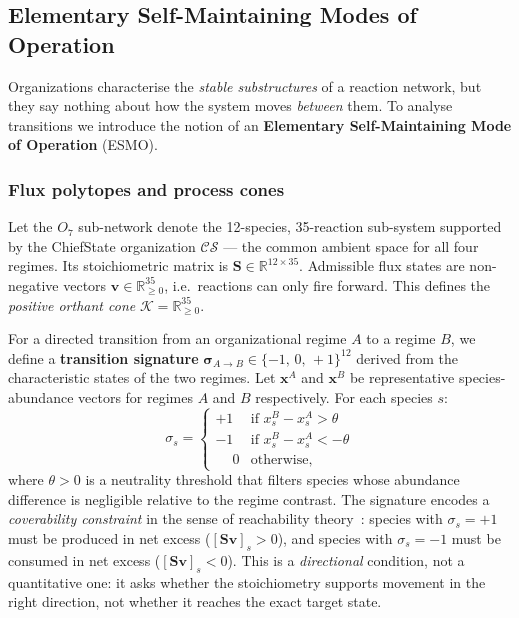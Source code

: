 \subsection{Elementary Self-Maintaining Modes of Operation}
\label{sec:esmo_theory}

Organizations characterise the \emph{stable substructures} of a reaction
network, but they say nothing about how the system moves \emph{between}
them.  To analyse transitions we introduce the notion of an
\textbf{Elementary Self-Maintaining Mode of Operation} (ESMO).

\subsubsection*{Flux polytopes and process cones}

Let the $O_7$ sub-network denote the 12-species, 35-reaction sub-system
supported by the ChiefState organization $\mathcal{CS}$ --- the common
ambient space for all four regimes.  Its stoichiometric matrix is
$\mathbf{S} \in \mathbb{R}^{12 \times 35}$.  Admissible flux states are
non-negative vectors $\mathbf{v} \in \mathbb{R}^{35}_{\geq 0}$,
i.e.\ reactions can only fire forward.  This defines the \emph{positive
orthant cone} $\mathcal{K} = \mathbb{R}^{35}_{\geq 0}$.

For a directed transition from an organizational regime $A$ to a regime $B$,
we define a \textbf{transition signature}
$\boldsymbol{\sigma}_{A \to B} \in \{-1,\, 0,\, +1\}^{12}$ derived from
the characteristic states of the two regimes.  Let $\mathbf{x}^A$ and
$\mathbf{x}^B$ be representative species-abundance vectors for regimes $A$
and $B$ respectively.  For each species $s$:
\begin{equation}
  \sigma_s = \begin{cases}
    +1  & \text{if } x^B_s - x^A_s >  \theta \\
    -1  & \text{if } x^B_s - x^A_s < -\theta \\
    \phantom{+}0 & \text{otherwise,}
  \end{cases}
  \label{eq:signature}
\end{equation}
where $\theta > 0$ is a neutrality threshold that filters species whose
abundance difference is negligible relative to the regime contrast.
The signature encodes a \emph{coverability constraint} in the sense of
reachability theory~\cite{veloz2022resilience}: species with
$\sigma_s = +1$ must be produced in net excess ($[\mathbf{S}\mathbf{v}]_s > 0$),
and species with $\sigma_s = -1$ must be consumed in net excess
($[\mathbf{S}\mathbf{v}]_s < 0$).  This is a \emph{directional} condition,
not a quantitative one: it asks whether the stoichiometry supports movement
in the right direction, not whether it reaches the exact target state.

